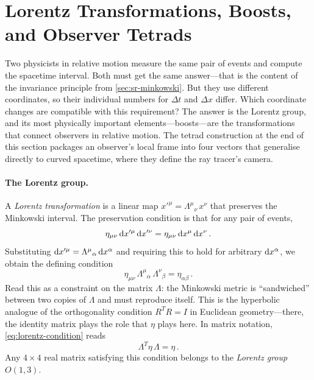 \section{Lorentz Transformations, Boosts, and Observer Tetrads}
\label{sec:sr-lorentz}

Two physicists in relative motion measure the same pair of events and compute
the spacetime interval.  Both must get the same answer---that is the content of
the invariance principle from \cref{sec:sr-minkowski}.  But they use different
coordinates, so their individual numbers for $\Delta t$ and $\Delta x$ differ.
Which coordinate changes are compatible with this requirement?  The answer is
the Lorentz group, and its most physically important elements---boosts---are
the transformations that connect observers in relative motion.  The tetrad
construction at the end of this section packages an observer's local frame into
four vectors that generalise directly to curved spacetime, where they define the
ray tracer's camera.

\paragraph{The Lorentz group.}

A \emph{Lorentz transformation} is a linear map $x'^\mu = \Lambda^\mu{}_\nu\,
x^\nu$ that preserves the Minkowski interval.  The preservation condition is
that for any pair of events,
%
\begin{equation}
  \eta_{\mu\nu}\,\mathrm{d} x'^\mu\,\mathrm{d} x'^\nu
    = \eta_{\mu\nu}\,\mathrm{d} x^\mu\,\mathrm{d} x^\nu \,.
  \label{eq:interval-invariance}
\end{equation}
%
Substituting $\mathrm{d} x'^\mu = \Lambda^\mu{}_\alpha\,\mathrm{d} x^\alpha$ and requiring this
to hold for arbitrary $\mathrm{d} x^\alpha$, we obtain the defining condition
%
\begin{equation}
  \eta_{\mu\nu}\,\Lambda^\mu{}_\alpha\,\Lambda^\nu{}_\beta
    = \eta_{\alpha\beta} \,.
  \label{eq:lorentz-condition}
\end{equation}
%
Read this as a constraint on the matrix $\Lambda$: the Minkowski metric is
``sandwiched'' between two copies of $\Lambda$ and must reproduce itself.  This
is the hyperbolic analogue of the orthogonality condition $R^T R = I$ in
Euclidean geometry---there, the identity matrix plays the role that $\eta$ plays
here.  In matrix notation, \cref{eq:lorentz-condition} reads
%
\begin{equation}
  \Lambda^{T}\!\eta\,\Lambda = \eta \,.
  \label{eq:lorentz-matrix}
\end{equation}
%
Any $4 \times 4$ real matrix satisfying this condition belongs to the
\emph{Lorentz group} $O(1,3)$.


